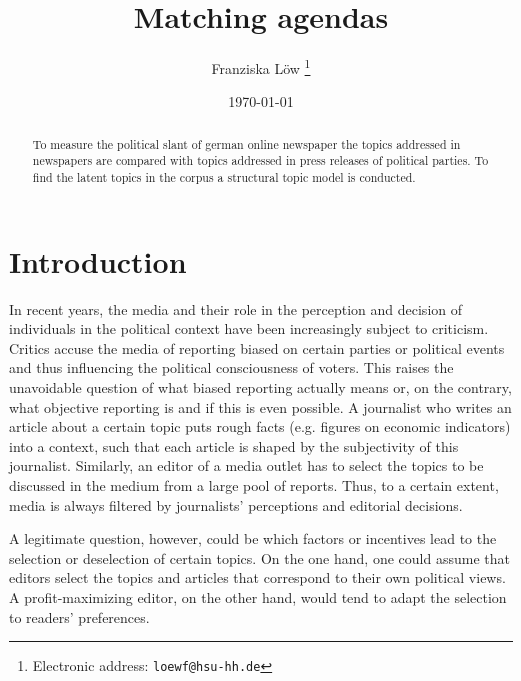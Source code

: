 \documentclass[12pt,a4paper,notitlepage]{article}
\title{Matching agendas}
\date{\today}
\author{Franziska Löw
  \thanks{Electronic address: \texttt{loewf@hsu-hh.de}}}
\affil{Department of Industrial Economics,\\ Helmut Schmidt University,\\ Hamburg, Germany}
\begin{document}
\begin{titlepage}
	\maketitle
	\begin{abstract}
	To measure the political slant of german online newspaper the topics addressed in newspapers are compared with topics addressed in press releases of political parties. To find the latent topics in the corpus a structural topic model is conducted. 

	\end{abstract}

\end{titlepage}

\tableofcontents

\pagebreak


\section{Introduction}

In recent years, the media and their role in the perception and decision of individuals in the political context have been increasingly subject to criticism. Critics accuse the media of reporting biased on certain parties or political events and thus influencing the political consciousness of voters. This raises the unavoidable question of what biased reporting actually means or, on the contrary, what objective reporting is and if this is even possible. A journalist who writes an article about a certain topic puts rough facts (e.g. figures on economic indicators) into a context, such that each article is shaped by the subjectivity of this journalist. Similarly, an editor of a media outlet has to select the topics to be discussed in the medium from a large pool of reports. Thus, to a certain extent, media is always filtered by journalists' perceptions and editorial decisions. 

A legitimate question, however, could be which factors or incentives lead to the selection or deselection of certain topics. On the one hand, one could assume that editors select the topics and articles that correspond to their own political views. A profit-maximizing editor, on the other hand, would tend to adapt the selection to readers' preferences.
\end{document}
